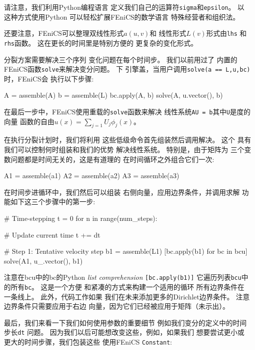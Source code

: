 请注意，我们利用Python编程语言
定义我们自己的运算符\texttt{sigma}和\texttt{epsilon}。 以这种方式使用Python
可以轻松扩展FEniCS的数学语言
特殊经营者和组织法。

还要注意，FEniCS可以整理双线性形式$a(u,v)$和
线性形式$L(v)$形式由\texttt{lhs}
和\texttt{rhs}函数。 这在更长的时间里是特别方便的
更复杂的变化形式。

分裂方案需要解决三个序列
变化问题在每个时间步。 我们以前用过了
内置的FEniCS函数\texttt{solve}来解决变分问题。 下
引擎盖，当用户调用\texttt{solve(a == L,u,bc)}时，FEniCS会
执行以下步骤:

\begin{python}
A = assemble(A)
b = assemble(L)
bc.apply(A, b)
solve(A, u.vector(), b)
\end{python}
在最后一步中，FEniCS使用重载的\texttt{solve}函数来解决
线性系统\texttt{AU = b}其中\texttt{U}是度的向量
函数的自由$u(x) = \sum_{j=1} U_j \phi_j(x)$。


在执行分裂计划时，我们将利用
这些低级命令首先组装然后调用解决。 这个
具有我们可以控制何时组装和我们的优势
解决线性系统。 特别是，由于矩阵为
三个变数问题都是时间无关的，这是有道理的
在时间循环之外组合它们一次:


\begin{python}
A1 = assemble(a1)
A2 = assemble(a2)
A3 = assemble(a3)
\end{python}
在时间步进循环中，我们然后可以组装
右侧向量，应用边界条件，并调用求解
功能如下这三个步骤中的第一步:

\begin{python}
# Time-stepping
t = 0
for n in range(num_steps):

    # Update current time
    t += dt

    # Step 1: Tentative velocity step
    b1 = assemble(L1)
    [bc.apply(b1) for bc in bcu]
    solve(A1, u_.vector(), b1)
\end{python}
注意在bcu中的bc的Python \emph{list comprehension} \texttt{[bc.apply(b1)]}
它遍历列表\texttt{bcu}中的所有\texttt{bc}。 这是一个方便
和紧凑的方式来构建一个适用的循环
所有边界条件在一条线上。 此外，代码工作如果
我们在未来添加更多的Dirichlet边界条件。 注意
边界条件只需要应用于右边
向量，因为它们已经被应用于矩阵（未示出）。

最后，我们来看一下我们如何使用参数的重要细节
例如我们变分的定义中的时间步长\texttt{dt}
问题。 因为我们以后可能想改变这些，例如，如果我们
想要尝试更小或更大的时间步骤，我们包装这些
使用FEniCS \texttt{Constant}:

